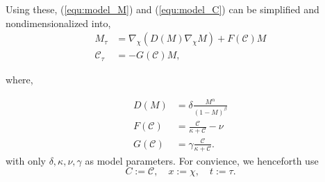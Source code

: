 % 
% 
% 
% 
% 
% 

Using these, (\ref{equ:model_M}) and (\ref{equ:model_C}) can be simplified and nondimensionalized into, 
\begin{align} \label{equ:model_system}
  M_\tau &= \nabla_\chi \left( D(M) \nabla_\chi M \right) + F(\mathcal{C}) M \\
  \mathcal{C}_\tau &= - G(\mathcal{C}) M, 
\end{align}

where,

\begin{equation}
\begin{aligned} \label{equ:model_functions}
  D(M) &= \delta \frac{M^\alpha}{(1 - M)^\beta} \\
  F(\mathcal{C}) &= \frac{ \mathcal{C}} {\kappa + \mathcal{C}} - \nu \\
  G(\mathcal{C}) &= \gamma \frac{\mathcal{C}}{\kappa +\mathcal{C}}.
\end{aligned}
\end{equation}
with only $\delta, \kappa, \nu, \gamma$ as model parameters. 
For convience, we henceforth use
\begin{equation}
  C := \mathcal{C},\quad x := \chi,\quad t := \tau.
\end{equation}

